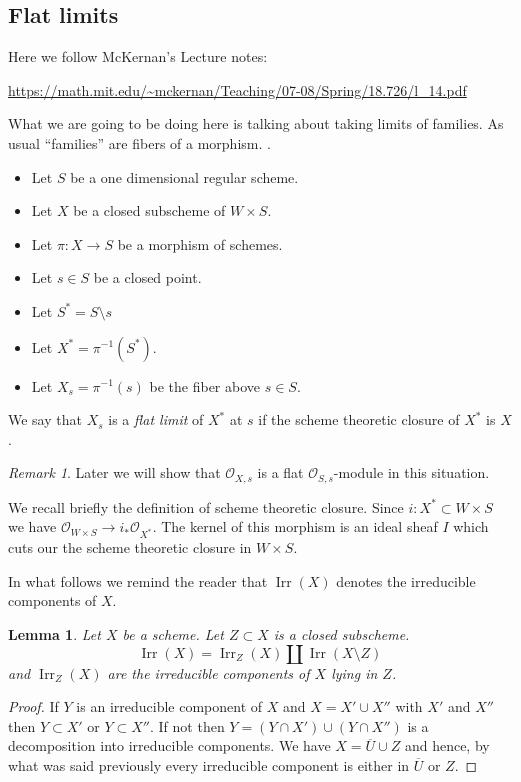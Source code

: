 \documentclass[12pt]{article}
\numberwithin{equation}{section}
\newtheorem{lemma}[theorem]{Lemma}
\theoremstyle{definition}
\theoremstyle{remark}
\newtheorem{remark}[theorem]{Remark}
\newcommand{\Ocal}{\mathcal{O}}
\newcommand{\Irr}{\operatorname{Irr}}
\begin{document}
\subsection{Flat limits}
Here we follow McKernan's Lecture notes:
\begin{center}
	\url{https://math.mit.edu/~mckernan/Teaching/07-08/Spring/18.726/l_14.pdf}
\end{center}
What we are going to be doing here is talking about taking limits of families. 
As usual ``families'' are fibers of a morphism. .

\begin{itemize}
	\item Let $S$ be a one dimensional regular scheme.
	\item Let $X$ be a closed subscheme of $W\times S$. 
	\item Let $\pi:X\to S$ be a morphism of schemes.
	\item Let $s\in S$ be a closed point. 
	\item Let $S^* = S \setminus  s$
	\item Let $X^* = \pi^{-1}(S^*)$.
	\item Let $X_s=\pi^{-1}(s)$ be the fiber above $s\in S$. 
\end{itemize}
We say that $X_s$ is a \emph{flat limit} of $X^*$ at $s$ if the scheme theoretic closure of $X^*$ is $X$. 

\begin{remark}
	Later we will show that $\Ocal_{X,s}$ is a flat $\Ocal_{S,s}$-module in this situation.
\end{remark}

We recall briefly the definition of scheme theoretic closure.
Since $i:X^* \subset W\times S$ we have $\Ocal_{W\times S} \to i_*\Ocal_{X^*}$.
The kernel of this morphism is an ideal sheaf $I$ which cuts our the scheme theoretic closure in $W\times S$. 



In what follows we remind the reader that $\Irr(X)$ denotes the irreducible components of $X$.
\begin{lemma}
	Let $X$ be a scheme. 
	Let $Z\subset X$ is a closed subscheme. 
	$$ \Irr(X) = \Irr_Z(X) \amalg \Irr(X\setminus Z)$$
	and $\Irr_Z(X)$ are the irreducible components of $X$ lying in $Z$.
\end{lemma}
\begin{proof}
	If $Y$ is an irreducible component of $X$ and $X = X' \cup X''$ with $X'$ and $X''$ then $Y \subset X'$ or $Y \subset X''$. 
	If not then $Y = (Y \cap X') \cup (Y \cap X'')$ is a decomposition into irreducible components. 
	We have $X = \overline{U} \cup Z$ and hence, by what was said previously every irreducible component is either in $\overline{U}$ or $Z$. 
\end{proof}
\end{document}
